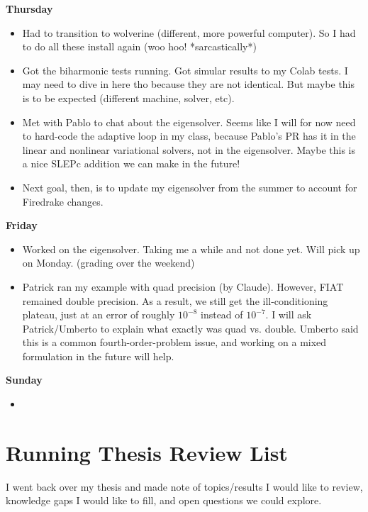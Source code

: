 \documentclass[12pt,a4paper]{article}
\begin{document}
\textbf{Thursday}
\begin{itemize}
    \item Had to transition to wolverine (different, more powerful computer). So I had to do all these install again (woo hoo! *sarcastically*)
    \item Got the biharmonic tests running. Got simular results to my Colab tests. I may need to dive in here tho because they are not identical. But maybe this is to be expected (different machine, solver, etc). 
    \item Met with Pablo to chat about the eigensolver. Seems like I will for now need to hard-code the adaptive loop in my class, because Pablo's PR has it in the linear and nonlinear variational solvers, not in the eigensolver. Maybe this is a nice SLEPc addition we can make in the future!  
    \item Next goal, then, is to update my eigensolver from the summer to account for Firedrake changes.
\end{itemize}

\textbf{Friday}

\begin{itemize}
    \item Worked on the eigensolver. Taking me a while and not done yet. Will pick up on Monday. (grading over the weekend)
    \item Patrick ran my example with quad precision (by Claude). However, FIAT remained double precision. As a result, we still get the ill-conditioning plateau, just at an error of roughly $10^{-8}$ instead of $10^{-7}.$ I will ask Patrick/Umberto to explain what exactly was quad vs. double. Umberto said this is a common fourth-order-problem issue, and working on a mixed formulation in the future will help. 
\end{itemize}


\textbf{Sunday}

\begin{itemize}
    \item 
\end{itemize}


\newpage

\section{Running Thesis Review List}

I went back over my thesis and made note of topics/results I would like to review, knowledge gaps I would like to fill, and open questions we could explore. 
\end{document}
